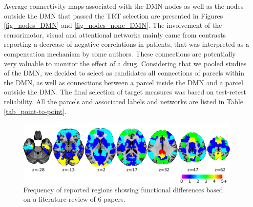\documentclass[authoryear]{elsarticle}
\begin{document}
Average connectivity maps associated with the DMN nodes as well as the nodes outside the DMN that passed the TRT selection are presented in Figures \ref{fig_nodes_DMN} and \ref{fig_nodes_none_DMN}. The involvement of the sensorimotor, visual and attentional networks mainly came from contrasts reporting a decrease of negative correlations in patients, that was interpreted as a compensation mechanism by some authors. These connections are potentially very valuable to monitor the effect of a drug. Considering that we pooled studies of the DMN, we decided to select as candidates all connections of parcels within the DMN, as well as connections between a parcel inside the DMN and a parcel outside the DMN. The final selection of target measures was based on test-retest reliability. All the parcels and associated labels and networks are listed in Table \ref{tab_point-to-point}.


\begin{figure}[H]
\begin{center}
\includegraphics[width=\linewidth]{../figures/fig_freq_sel_dat.png}
\end{center}
\caption[Cited region frequency]{
  Frequency of reported regions showing functional differences based on a literature review of 6 papers.
}
\label{fig_freq_sel}
\end{figure}
\end{document}
